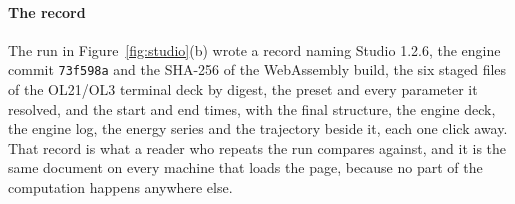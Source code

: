 \paragraph{The record}
The run in Figure~\ref{fig:studio}(b) wrote a record naming Studio 1.2.6, the
engine commit \texttt{73f598a} and the SHA-256 of the WebAssembly build, the
six staged files of the OL21/OL3 terminal deck by digest, the preset and every
parameter it resolved, and the start and end times, with the final structure,
the engine deck, the engine log, the energy series and the trajectory beside
it, each one click away. That record is what a reader who repeats the run
compares against, and it is the same document on every machine that loads the
page, because no part of the computation happens anywhere else.
